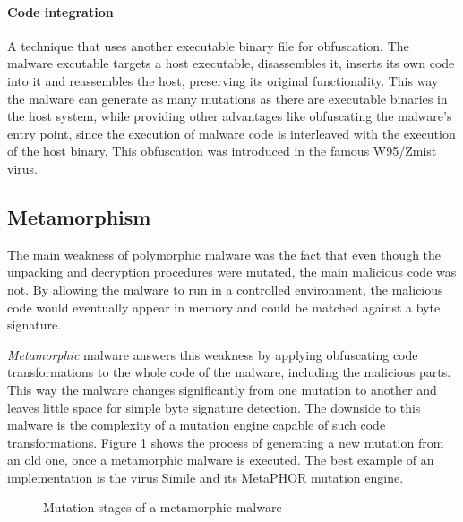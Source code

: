 \paragraph*{Code integration}
A technique that uses another executable binary file for obfuscation. The malware excutable targets a host executable, disassembles it, inserts its own code into it and reassembles the host, preserving its original functionality. This way the malware can generate as many mutations as there are executable binaries in the host system, while providing other advantages like obfuscating the malware's entry point, since the execution of malware code is interleaved with the execution of the host binary. This obfuscation was introduced in the famous W95/Zmist virus.

\subsection{Metamorphism}
The main weakness of polymorphic malware was the fact that even though the unpacking and decryption procedures were mutated, the main malicious code was not. By allowing the malware to run in a controlled environment, the malicious code would eventually appear in memory and could be matched against a byte signature.

\emph{Metamorphic} malware answers this weakness by applying obfuscating code transformations to the whole code of the malware, including the malicious parts. This way the malware changes significantly from one mutation to another and leaves little space for simple byte signature detection. The downside to this malware is the complexity of a mutation engine capable of such code transformations. Figure \ref{fig_metamorph} shows the process of generating a new mutation from an old one, once a metamorphic malware is executed. The best example of an implementation is the virus Simile and its MetaPHOR mutation engine.

\begin{figure}[H]
    \centering
    \caption{Mutation stages of a metamorphic malware}
    \label{fig_metamorph}
\end{figure}


